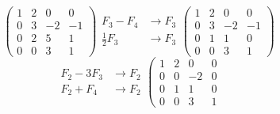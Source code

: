 \documentclass[../practica.root.tex]{subfiles}
\begin{document}
\begin{enumerate}
\begin{enumerate}
\begin{itemize}
\[\begin{array}{rl}
                                  \end{array}
                              \] \[
                                  \left(
                                  \begin{array}{ccc|c}
                                          1 & 2 & 0  & 0  \\
                                          0 & 3 & -2 & -1 \\
                                          0 & 2 & 5  & 1  \\
                                          0 & 0 & 3  & 1
                                      \end{array}
                                  \right)
                                  \begin{array}{rl}
                                      F_3 - F_4      & \to F_3 \\
                                      \frac{1}{2}F_3 & \to F_3
                                  \end{array}
                                  \left(
                                  \begin{array}{ccc|c}
                                          1 & 2 & 0  & 0  \\
                                          0 & 3 & -2 & -1 \\
                                          0 & 1 & 1  & 0  \\
                                          0 & 0 & 3  & 1
                                      \end{array}
                                  \right)
                              \] \[
                                  \begin{array}{rl}
                                      F_2 - 3F_3 & \to F_2 \\
                                      F_2 + F_4  & \to F_2
                                  \end{array}
                                  \left(
                                  \begin{array}{ccc|c}
                                          1 & 2 & 0  & 0 \\
                                          0 & 0 & -2 & 0 \\
                                          0 & 1 & 1  & 0 \\
                                          0 & 0 & 3  & 1
                                      \end{array}
\]
\end{itemize}
\end{enumerate}
\end{enumerate}
\end{document}
